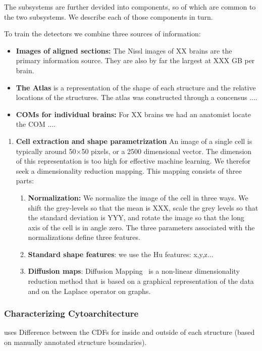 \documentclass[runningheads]{llncs}
\begin{document}
The subsystems are further devided into components, so of which
are common to the two subsystems. We describe each of those components
in turn.

To train the detectors we combine three sources of information:
\begin{itemize}
    \item {\bf Images of aligned sections:} The Nissl images of XX brains are the primary information source. They are also by far the largest at XXX GB per brain.
    \item {\bf The Atlas} is a representation of the shape of each structure and the relative locations of the structures. The atlas was constructed through a concensus ....
    \item {\bf COMs for individual brains:} For XX brains we had an anatomist locate the COM ....
\end{itemize}

\begin{enumerate}
\item{\bf Cell extraction and shape parametrization}
An image of a single cell is typically around 50$\times$50 pixels, or a 2500 dimensional vector. The dimension of this representation is too high for effective machine learning. We therefor seek a dimensionality reduction mapping. This mapping consists of three parts:
\begin{enumerate}
    \item {\bf Normalization:} We normalize the image of the cell in three ways. We 
    shift the grey-levels so that the mean is XXX, scale the grey levels so that the standard deviation is YYY, and rotate the image so that the long axis of the cell is in angle zero. The three parameters associated with the normalizations define three features.
    \item {\bf Standard shape features}: we use the Hu features: x,y,z...
    \item{ \bf Diffusion maps}: Diffusion
      Mapping~\cite{belkin2003,coifman2005geometric} is a non-linear
      dimensionality reduction method that is based on a graphical
      representation of the data and on the Laplace operator on
      graphs.
      \end{enumerate}
\end{enumerate}
\subsubsection{ Characterizing Cytoarchitecture} uses Difference between the CDFs for inside and outside of each structure (based on manually annotated structure boundaries). 
\end{document}
